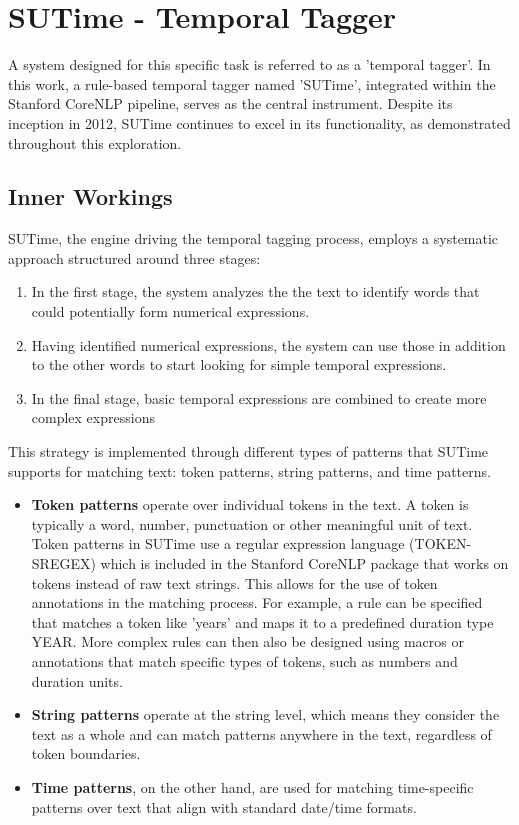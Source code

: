 \documentclass[a4paper,10pt]{report} %
\begin{document}
\section{SUTime - Temporal Tagger}
A system designed for this specific task is referred to as a 'temporal tagger'. In this work, a rule-based temporal tagger named 'SUTime', integrated within the Stanford CoreNLP pipeline, serves as the central instrument. Despite its inception in 2012, SUTime continues to excel in its functionality, as demonstrated throughout this exploration.

\subsection{Inner Workings}
SUTime, the engine driving the temporal tagging process, employs a systematic approach structured around three stages:

\begin{enumerate}
  \item In the first stage, the system analyzes the the text to identify words that could potentially form numerical expressions.

  \item Having identified numerical expressions, the system can use those in addition to the other words to start looking for simple temporal expressions.

  \item In the final stage, basic temporal expressions are combined to create more complex expressions
\end{enumerate}

This strategy is implemented through different types of patterns that SUTime supports for matching text: token patterns, string patterns, and time patterns.

\begin{itemize}
  \item \textbf{Token patterns} operate over individual tokens in the text. A token is typically a word, number, punctuation or other meaningful unit of text. Token patterns in SUTime use a regular expression language (TOKEN-SREGEX) which is included in the Stanford CoreNLP package that works on tokens instead of raw text strings. This allows for the use of token annotations in the matching process. For example, a rule can be specified that matches a token like 'years' and maps it to a predefined duration type YEAR. More complex rules can then also be designed using macros or annotations that match specific types of tokens, such as numbers and duration units.

  \item \textbf{String patterns} operate at the string level, which means they consider the text as a whole and can match patterns anywhere in the text, regardless of token boundaries.

  \item \textbf{Time patterns}, on the other hand, are used for matching time-specific patterns over text that align with standard date/time formats.
\end{itemize}
\end{document}
